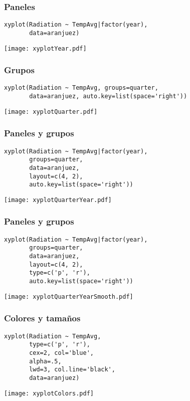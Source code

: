 \documentclass[xcolor={usenames,svgnames,dvipsnames}]{beamer}
\begin{document}
\begin{frame}[fragile]
\frametitle{Paneles}
\label{sec-2-1-6}


\lstset{language=R}
\begin{lstlisting}
xyplot(Radiation ~ TempAvg|factor(year),
       data=aranjuez)
\end{lstlisting}

\texttt{[image: xyplotYear.pdf]}
\end{frame}
\begin{frame}[fragile]
\frametitle{Grupos}
\label{sec-2-1-7}


\lstset{language=R}
\begin{lstlisting}
xyplot(Radiation ~ TempAvg, groups=quarter,
       data=aranjuez, auto.key=list(space='right'))
\end{lstlisting}

\texttt{[image: xyplotQuarter.pdf]}
\end{frame}
\begin{frame}[fragile]
\frametitle{Paneles y grupos}
\label{sec-2-1-8}


\lstset{language=R}
\begin{lstlisting}
xyplot(Radiation ~ TempAvg|factor(year),
       groups=quarter,
       data=aranjuez,
       layout=c(4, 2),
       auto.key=list(space='right'))
\end{lstlisting}

\texttt{[image: xyplotQuarterYear.pdf]}
\end{frame}
\begin{frame}[fragile]
\frametitle{Paneles y grupos}
\label{sec-2-1-9}


\lstset{language=R}
\begin{lstlisting}
xyplot(Radiation ~ TempAvg|factor(year),
       groups=quarter,
       data=aranjuez,
       layout=c(4, 2),
       type=c('p', 'r'),
       auto.key=list(space='right'))
\end{lstlisting}

\texttt{[image: xyplotQuarterYearSmooth.pdf]}
\end{frame}
\begin{frame}[fragile]
\frametitle{Colores y tamaños}
\label{sec-2-1-10}


\lstset{language=R}
\begin{lstlisting}
xyplot(Radiation ~ TempAvg,
       type=c('p', 'r'),
       cex=2, col='blue',
       alpha=.5,
       lwd=3, col.line='black',
       data=aranjuez)
\end{lstlisting}

\texttt{[image: xyplotColors.pdf]}
\end{frame}
\end{document}
